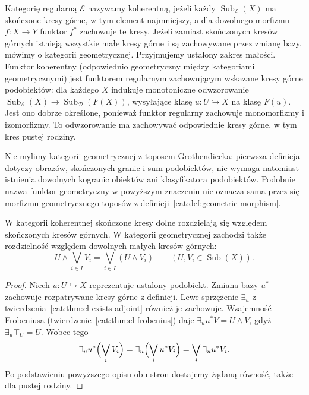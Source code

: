 \begin{definicja}\label{cat:def:cl-coherent-category}
Kategorię regularną $\mathcal E$ nazywamy koherentną, jeżeli każdy $\operatorname{Sub}_{\mathcal E}(X)$ ma skończone kresy górne, w tym element najmniejszy, a dla dowolnego morfizmu $f:X\to Y$ funktor $f^*$ zachowuje te kresy. Jeżeli zamiast skończonych kresów górnych istnieją wszystkie małe kresy górne i są zachowywane przez zmianę bazy, mówimy o kategorii geometrycznej. Przyjmujemy ustalony zakres małości. Funktor koherentny (odpowiednio geometryczny między kategoriami geometrycznymi) jest funktorem regularnym zachowującym wskazane kresy górne podobiektów: dla każdego $X$ indukuje monotoniczne odwzorowanie $\operatorname{Sub}_{\mathcal E}(X)\to\operatorname{Sub}_{\mathcal D}(F(X))$, wysyłające klasę $u:U\hookrightarrow X$ na klasę $F(u)$. Jest ono dobrze określone, ponieważ funktor regularny zachowuje monomorfizmy i izomorfizmy. To odwzorowanie ma zachowywać odpowiednie kresy górne, w tym kres pustej rodziny.
\end{definicja}

Nie mylimy kategorii geometrycznej z toposem Grothendiecka: pierwsza definicja dotyczy obrazów, skończonych granic i sum podobiektów, nie wymaga natomiast istnienia dowolnych kogranic obiektów ani klasyfikatora podobiektów. Podobnie nazwa funktor geometryczny w powyższym znaczeniu nie oznacza sama przez się morfizmu geometrycznego toposów z definicji~\ref{cat:def:geometric-morphism}.

\begin{stwierdzenie}\label{cat:prop:cl-coherent-distributivity}
W kategorii koherentnej skończone kresy dolne rozdzielają się względem skończonych kresów górnych. W kategorii geometrycznej zachodzi także rozdzielność względem dowolnych małych kresów górnych:
\[
 U\wedge\bigvee_{i\in I}V_i
 =\bigvee_{i\in I}(U\wedge V_i)
 \qquad(U,V_i\in\operatorname{Sub}(X)).
\]
\end{stwierdzenie}
\begin{proof}
Niech $u:U\hookrightarrow X$ reprezentuje ustalony podobiekt. Zmiana bazy $u^*$ zachowuje rozpatrywane kresy górne z definicji. Lewe sprzężenie $\exists_u$ z twierdzenia~\ref{cat:thm:cl-exists-adjoint} również je zachowuje. Wzajemność Frobeniusa (twierdzenie~\ref{cat:thm:cl-frobenius}) daje $\exists_u u^*V=U\wedge V$, gdyż $\exists_u\top_U=U$. Wobec tego
\[
 \exists_u u^*\Bigl(\bigvee_iV_i\Bigr)
 =\exists_u\Bigl(\bigvee_i u^*V_i\Bigr)
 =\bigvee_i\exists_u u^*V_i.
\]
Po podstawieniu powyższego opisu obu stron dostajemy żądaną równość, także dla pustej rodziny.
\end{proof}

